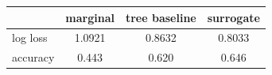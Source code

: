 \begin{tabular}{lccc}
\toprule
 & marginal & tree baseline & surrogate \\
\midrule
log loss & 1.0921 & 0.8632 & 0.8033 \\
accuracy & 0.443 & 0.620 & 0.646 \\
\bottomrule
\end{tabular}
